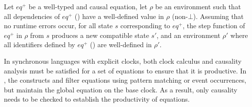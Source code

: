 \begin{lemma}
    \label{lem:semantics:grsync:theorems:productivity:equations}
    Let $eq^+$ be a well-typed and causal \GRSync equation, let $\rho$ be an environment such that
    all dependencies of $eq^+$ (\ie {}) have a well-defined value in $\rho$ (non-$\bot$).
    Assuming that no runtime errors occur, for all state $s$ corresponding to $eq^+$, the step
    function of $eq^+$ in $\rho$ from $s$ produces a new compatible state $s'$, and an environment
    $\rho'$ where all identifiers defined by $eq^+$ (\ie {}) are well-defined in $\rho'$.
\end{lemma}
\begin{remark}
    In synchronous languages with explicit clocks, both clock calculus and causality analysis must
    be satisfied for a set of equations to ensure that it is productive. In \GRSync, the constructs
     and  filter equations using pattern matching or event occurrences,
    but maintain the global equation on the base clock. As a result, only causality needs to be
    checked to establish the productivity of \GRSync equations.
\end{remark}
